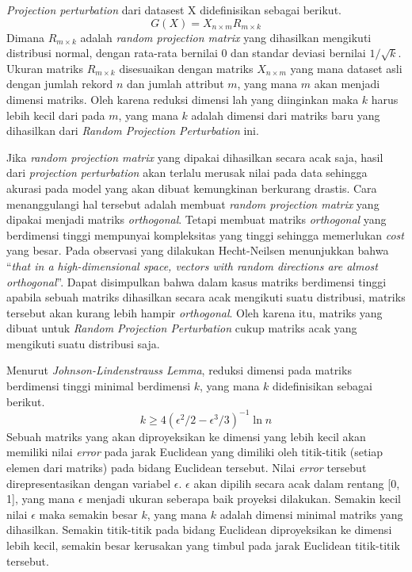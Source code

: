 \textit{Projection perturbation} dari datasest X didefinisikan sebagai berikut.~\cite{kargupta:06:projection}
\begin{equation}
	G(X) = X_{n \times m} R_{m \times k}
\end{equation}
Dimana \(R_{m \times k}\) adalah \textit{random projection matrix} yang dihasilkan mengikuti distribusi normal, dengan rata-rata bernilai 0 dan standar deviasi bernilai \(1/\sqrt{k}\). Ukuran matriks \(R_{m \times k}\) disesuaikan dengan matriks \(X_{n \times m}\) yang mana dataset asli dengan jumlah rekord \(n\) dan jumlah attribut \(m\), yang mana \(m\) akan menjadi dimensi matriks. Oleh karena reduksi dimensi lah yang diinginkan maka \(k\) harus lebih kecil dari pada \(m\), yang mana \(k\) adalah dimensi dari matriks baru yang dihasilkan dari \textit{Random Projection Perturbation} ini.

Jika \textit{random projection matrix} yang dipakai dihasilkan secara acak saja, hasil dari \textit{projection perturbation} akan terlalu merusak nilai pada data sehingga akurasi pada model yang akan dibuat kemungkinan berkurang drastis. Cara menanggulangi hal tersebut adalah membuat \textit{random projection matrix} yang dipakai menjadi matriks \textit{orthogonal}. Tetapi membuat matriks \textit{orthogonal} yang berdimensi tinggi mempunyai kompleksitas yang tinggi sehingga memerlukan \textit{cost} yang besar. Pada observasi yang dilakukan Hecht-Neilsen menunjukkan bahwa “\textit{that in a high-dimensional space, vectors with random directions are almost orthogonal}”. Dapat disimpulkan bahwa dalam kasus matriks berdimensi tinggi apabila sebuah matriks dihasilkan secara acak mengikuti suatu distribusi, matriks tersebut akan kurang lebih hampir \textit{orthogonal}. Oleh karena itu, matriks yang dibuat untuk \textit{Random Projection Perturbation} cukup matriks acak yang mengikuti suatu distribusi saja.

Menurut \textit{Johnson-Lindenstrauss Lemma}, reduksi dimensi pada matriks berdimensi tinggi minimal berdimensi \(k\), yang mana \(k\) didefinisikan sebagai berikut.
\begin{equation}
	k \geq 4(\epsilon^{2}/2-\epsilon^{3}/3)^{-1}\ln{n}
\end{equation}
Sebuah matriks yang akan diproyeksikan ke dimensi yang lebih kecil akan memiliki nilai \textit{error} pada jarak Euclidean yang dimiliki oleh titik-titik (setiap elemen dari matriks) pada bidang Euclidean tersebut. Nilai \textit{error} tersebut direpresentasikan dengan variabel \(\epsilon\). \(\epsilon\) akan dipilih secara acak dalam rentang [0, 1], yang mana \(\epsilon\) menjadi ukuran seberapa baik proyeksi dilakukan. Semakin kecil nilai \(\epsilon\) maka semakin besar \(k\), yang mana \(k\) adalah dimensi minimal matriks yang dihasilkan. Semakin titik-titik pada bidang Euclidean diproyeksikan ke dimensi lebih kecil, semakin besar kerusakan yang timbul pada jarak Euclidean titik-titik tersebut.
